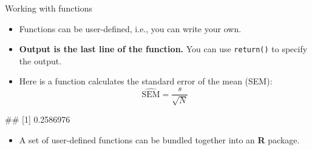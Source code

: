 \documentclass[ignorenonframetext,]{beamer}
\newenvironment{Shaded}{\begin{snugshade}}{\end{snugshade}}
\newcommand{\KeywordTok}[1]{\textcolor[rgb]{0.13,0.29,0.53}{\textbf{#1}}}
\newcommand{\DataTypeTok}[1]{\textcolor[rgb]{0.13,0.29,0.53}{#1}}
\newcommand{\StringTok}[1]{\textcolor[rgb]{0.31,0.60,0.02}{#1}}
\newcommand{\CommentTok}[1]{\textcolor[rgb]{0.56,0.35,0.01}{\textit{#1}}}
\newcommand{\OtherTok}[1]{\textcolor[rgb]{0.56,0.35,0.01}{#1}}
\newcommand{\ControlFlowTok}[1]{\textcolor[rgb]{0.13,0.29,0.53}{\textbf{#1}}}
\newcommand{\OperatorTok}[1]{\textcolor[rgb]{0.81,0.36,0.00}{\textbf{#1}}}
\newcommand{\NormalTok}[1]{#1}
\providecommand{\tightlist}{%
  \setlength{\itemsep}{0pt}\setlength{\parskip}{0pt}}
\let\oldShaded\Shaded
\let\endoldShaded\endShaded
\renewenvironment{Shaded}{\footnotesize\oldShaded}{\endoldShaded}
\let\oldverbatim\verbatim
\let\endoldverbatim\endverbatim
\renewenvironment{verbatim}{\footnotesize\oldverbatim}{\endoldverbatim}
\begin{document}
\begin{frame}[fragile]{Working with functions}

\begin{itemize}
\tightlist
\item
  Functions can be user-defined, i.e., you can write your own.
\item
  \textbf{Output is the last line of the function.} You can use
  \texttt{return()} to specify the output.
\item
  Here is a function calculates the standard error of the mean (SEM):
  \vspace{-2pt} \[
  \mathrm{\hat{SEM}} = \frac{s}{\sqrt{N}}
  \] \vspace{-7pt}
\end{itemize}

\begin{Shaded}
\end{Shaded}

\begin{verbatim}
## [1] 0.2586976
\end{verbatim}

\begin{itemize}
\tightlist
\item
  A set of user-defined functions can be bundled together into an
  \textbf{R} package.
\end{itemize}

\end{frame}
\end{document}
